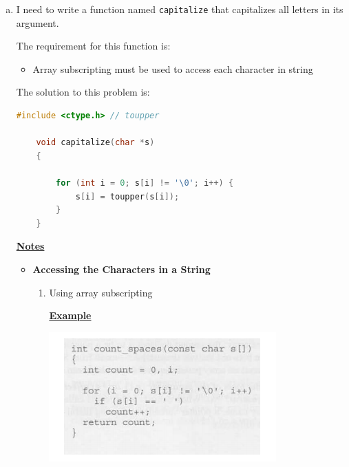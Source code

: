 \documentclass[12pt]{article}
\begin{document}
\begin{enumerate}[1.]
    \begin{enumerate}[a)]
        \item

        I need to write a function named \texttt{capitalize} that capitalizes all
        letters in its argument.

        \bigskip

        The requirement for this function is:

        \bigskip

        \begin{itemize}
            \item Array subscripting must be used to access each character in string
        \end{itemize}

        \bigskip

        The solution to this problem is:

        \bigskip

\begin{lstlisting}[language=c]
    #include <ctype.h> // toupper

    void capitalize(char *s)
    {

        for (int i = 0; s[i] != '\0'; i++) {
            s[i] = toupper(s[i]);
        }
    }
\end{lstlisting}

        \bigskip

        \underline{\textbf{Notes}}

        \begin{itemize}
            \item \textbf{Accessing the Characters in a String}

            \begin{enumerate}[1.]
                \item Using array subscripting

                \bigskip

                \underline{\textbf{Example}}

                \bigskip

                \begin{center}
                \includegraphics[width=0.7\linewidth]{images/review_6_solution_2.png}
                \end{center}


\end{enumerate}
\end{itemize}
\end{enumerate}
\end{enumerate}
\end{document}
